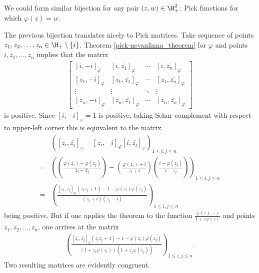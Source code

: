We could form similar bijection for any pair $(z, w) \in \H_{+}^{2}$: Pick functions for which $\varphi(z) = w$.

The previous bijection translates nicely to Pick matrices. Take sequence of points $z_{1}, z_{2}, \ldots, z_{n} \in \H_{+} \setminus \{i\}$. Theorem \ref{pick-nevanlinna_theorem} for $\varphi$ and points $i, z_{1}, \ldots, z_{n}$ implies that the matrix
\begin{align*}
	\begin{bmatrix}
		[i, -i]_{\varphi} & [i, \overline{z_{1}}]_{\varphi} & \cdots & [i, \overline{z_{n}}]_{\varphi} \\
		[z_{1}, -i]_{\varphi} & [z_{1}, \overline{z_{1}}]_{\varphi} & \cdots & [z_{1}, \overline{z_{n}}]_{\varphi} \\
		\vdots & \vdots & \ddots & \vdots \\
		[z_{n}, -i]_{\varphi} & [z_{n}, \overline{z_{1}}]_{\varphi} & \cdots &  [z_{n}, \overline{z_{n}}]_{\varphi}
	\end{bmatrix}
\end{align*}
is positive. Since $[i, -i]_{\varphi} = 1$ is positive, taking Schur-complement with respect to upper-left corner this is equivalent to the matrix
\begin{align*}
	& \left([z_{i}, \overline{z_{j}}]_{\varphi} - [z_{i}, -i]_{\varphi}[i, \overline{z_{j}}]_{\varphi}\right)_{1 \leq i, j \leq n} \\
	=& \left(\left(\frac{\varphi(z_{i})- \overline{\varphi(z_{j})}}{z_{i} - \overline{z_{j}}}\right) - \left(\frac{\varphi(z_{i}) + i}{z_{i} + i}\right)\left(\frac{i - \overline{\varphi(z_{j})}}{i - \overline{z_{j}}}\right)\right)_{1 \leq i, j \leq n} \\
	=& \left(\frac{[z_{i}, \overline{z_{j}}]_{\varphi} (z_{i} \overline{z_{j}} + 1) - 1 - \varphi(z_{i}) \overline{\varphi(z_{j})}}{(z_{i} + i) (\overline{z_{j}} - i)}\right)_{1 \leq i, j \leq n}
\end{align*}
being positive. But if one applies the theorem to the function $\frac{\varphi(z) - z}{1 + z \varphi(z)}$ and points $z_{1}, z_{2}, \ldots, z_{n}$, one arrives at the matrix
\begin{align*}
	\left(\frac{[z_{i}, \overline{z_{j}}]_{\varphi} (z_{i} \overline{z_{j}} + 1) - 1 - \varphi(z_{i}) \overline{\varphi(z_{j})}}{(1 + z_{i} \varphi(z_{i}))(1 + \overline{z_{j}} \overline{\varphi(z_{j})})}\right)_{1 \leq i, j \leq n}.
\end{align*}
Two resulting matrices are evidently congruent.

